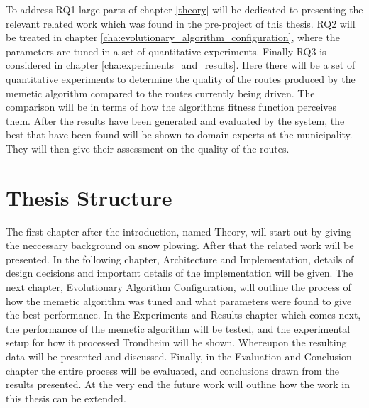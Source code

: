 To address RQ1 large parts of chapter \ref{theory} will be dedicated to presenting the relevant related work which was found in the pre-project of this thesis. RQ2 will be treated in chapter \ref{cha:evolutionary_algorithm_configuration}, where the parameters are tuned in a set of quantitative experiments. Finally RQ3 is considered in chapter \ref{cha:experiments_and_results}. Here there will be a set of quantitative experiments to determine the quality of the routes produced by the memetic algorithm compared to the routes currently being driven. The comparison will be in terms of how the algorithms fitness function perceives them. After the results have been generated and evaluated by the system, the best that have been found will be shown to domain experts at the municipality. They will then give their assessment on the quality of the routes.

\section{Thesis Structure}

The first chapter after the introduction, named Theory, will start out by giving the neccessary background on snow plowing. After that the related work will be presented. In the following chapter, Architecture and Implementation, details of design decisions and important details of the implementation will be given. The next chapter, Evolutionary Algorithm Configuration, will outline the process of how the memetic algorithm was tuned and what parameters were found to give the best performance. In the Experiments and Results chapter which comes next, the performance of the memetic algorithm will be tested, and the experimental setup for how it processed Trondheim will be shown. Whereupon the resulting data will be presented and discussed. Finally, in the Evaluation and Conclusion chapter the entire process will be evaluated, and conclusions drawn from the results presented. At the very end the future work will outline how the work in this thesis can be extended.

\cleardoublepage
